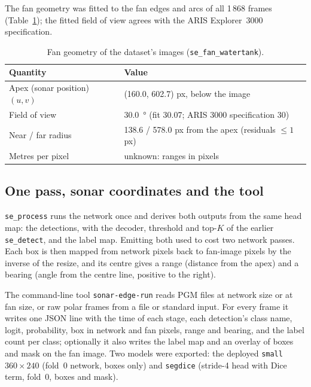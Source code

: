 \documentclass[11pt,a4paper]{article}
\newcommand{\cfg}[1]{\texttt{#1}}
\begin{document}
The fan geometry was fitted to the fan edges and arcs of all 1\,868
frames (Table~\ref{tab:fangeom}); the fitted field of view agrees with
the ARIS Explorer~3000 specification.

\begin{table}[H]
\centering
\caption{Fan geometry of the dataset's images (\texttt{se\_fan\_watertank}).}
\label{tab:fangeom}
\begin{tabular}{ll}
\toprule
Quantity & Value \\
\midrule
Apex (sonar position) $(u, v)$ & (160.0, 602.7) px, below the image \\
Field of view & \SI{30.0}{\degree} (fit 30.07; ARIS 3000 specification 30) \\
Near / far radius & 138.6 / 578.0 px from the apex (residuals $\le 1$ px) \\
Metres per pixel & unknown: ranges in pixels \\
\bottomrule
\end{tabular}
\end{table}

\subsection{One pass, sonar coordinates and the tool}

\texttt{se\_process} runs the network once and derives both outputs from
the same head map: the detections, with the decoder, threshold and
top-$K$ of the earlier \texttt{se\_detect}, and the label map. Emitting
both used to cost two network passes. Each box is then mapped from
network pixels back to fan-image pixels by the inverse of the resize, and
its centre gives a range (distance from the apex) and a bearing (angle
from the centre line, positive to the right).

The command-line tool \texttt{sonar-edge-run} reads PGM files at network
size or at fan size, or raw polar frames from a file or standard input.
For every frame it writes one JSON line with the time of each stage, each
detection's class name, logit, probability, box in network and fan
pixels, range and bearing, and the label count per class; optionally it
also writes the label map and an overlay of boxes and mask on the fan
image. Two models were exported: the deployed \cfg{small}
$360 \times 240$ (fold~0 network, boxes only) and \cfg{segdice}
(stride-4 head with Dice term, fold~0, boxes and mask).

\end{document}
